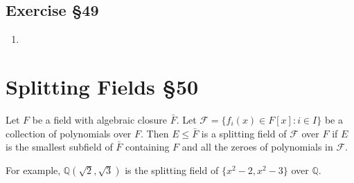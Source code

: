 \subsection{Exercise \S49}
\begin{enumerate}
	\item
\end{enumerate}

\section{Splitting Fields \S50}
\begin{definition}
	Let $F$ be a field with algebraic closure $\bar{F}$.
	Let $\mathscr{F} = \{ f_i(x) \in F[x] : i \in I \}$ be a collection of polynomials over $F$.
	Then $E \le \bar{F}$ is a splitting field of $\mathscr{F}$ over $F$ if $E$ is the smallest subfield of $\bar{F}$ containing $F$ and all the zeroes of polynomials in $\mathscr{F}$.
\end{definition}
For example, $\mathbb{Q}(\sqrt{2},\sqrt{3})$ is the splitting field of $\{ x^2-2,x^2-3 \}$ over $\mathbb{Q}$.

